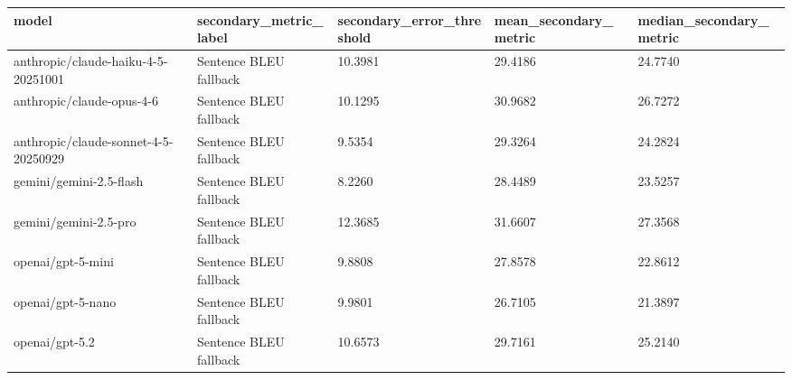 \begin{tabular}{lllll}
\toprule
model & secondary_metric_label & secondary_error_threshold & mean_secondary_metric & median_secondary_metric \\
\midrule
anthropic/claude-haiku-4-5-20251001 & Sentence BLEU fallback & 10.3981 & 29.4186 & 24.7740 \\
anthropic/claude-opus-4-6 & Sentence BLEU fallback & 10.1295 & 30.9682 & 26.7272 \\
anthropic/claude-sonnet-4-5-20250929 & Sentence BLEU fallback & 9.5354 & 29.3264 & 24.2824 \\
gemini/gemini-2.5-flash & Sentence BLEU fallback & 8.2260 & 28.4489 & 23.5257 \\
gemini/gemini-2.5-pro & Sentence BLEU fallback & 12.3685 & 31.6607 & 27.3568 \\
openai/gpt-5-mini & Sentence BLEU fallback & 9.8808 & 27.8578 & 22.8612 \\
openai/gpt-5-nano & Sentence BLEU fallback & 9.9801 & 26.7105 & 21.3897 \\
openai/gpt-5.2 & Sentence BLEU fallback & 10.6573 & 29.7161 & 25.2140 \\
\bottomrule
\end{tabular}
